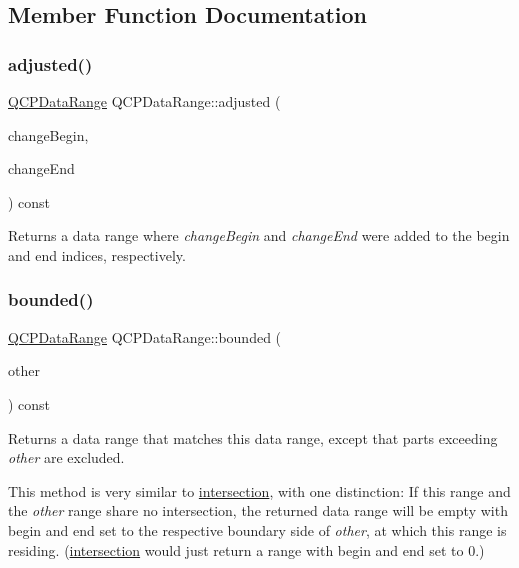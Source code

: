 \subsection{Member Function Documentation}
\mbox{\label{class_q_c_p_data_range_a279ed36602b39607699dc5652bcaf813}} 
\subsubsection{\texorpdfstring{adjusted()}{adjusted()}}
{\footnotesize\ttfamily \mbox{\hyperlink{class_q_c_p_data_range}{Q\+C\+P\+Data\+Range}} Q\+C\+P\+Data\+Range\+::adjusted (\begin{DoxyParamCaption}\item[{int}]{change\+Begin,  }\item[{int}]{change\+End }\end{DoxyParamCaption}) const\hspace{0.3cm}{\ttfamily [inline]}}

Returns a data range where {\itshape change\+Begin} and {\itshape change\+End} were added to the begin and end indices, respectively. \mbox{\label{class_q_c_p_data_range_a93529421d12fdd3a8bdb2b8061936352}} 
\subsubsection{\texorpdfstring{bounded()}{bounded()}}
{\footnotesize\ttfamily \mbox{\hyperlink{class_q_c_p_data_range}{Q\+C\+P\+Data\+Range}} Q\+C\+P\+Data\+Range\+::bounded (\begin{DoxyParamCaption}\item[{const \mbox{\hyperlink{class_q_c_p_data_range}{Q\+C\+P\+Data\+Range}} \&}]{other }\end{DoxyParamCaption}) const}

Returns a data range that matches this data range, except that parts exceeding {\itshape other} are excluded.

This method is very similar to \mbox{\hyperlink{class_q_c_p_data_range_a84e1e03129dd52528efb4bac18d30183}{intersection}}, with one distinction\+: If this range and the {\itshape other} range share no intersection, the returned data range will be empty with begin and end set to the respective boundary side of {\itshape other}, at which this range is residing. (\mbox{\hyperlink{class_q_c_p_data_range_a84e1e03129dd52528efb4bac18d30183}{intersection}} would just return a range with begin and end set to 0.) \mbox{\label{class_q_c_p_data_range_a13ca398776374a3160aa85433718b812}} 
